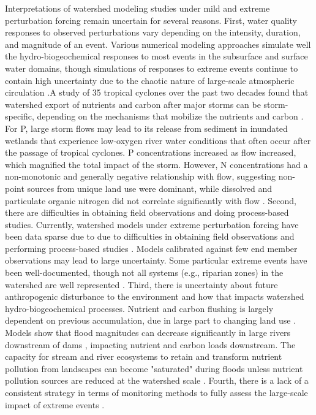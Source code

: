 \documentclass[preprint,review, 12pt]{elsarticle}
\begin{document}
Interpretations of watershed modeling studies under mild and extreme perturbation forcing remain uncertain for several reasons. First, water quality responses to observed perturbations vary depending on the intensity, duration, and magnitude of an event. Various numerical modeling approaches simulate well the hydro-biogeochemical responses to most events in the subsurface and surface water domains, though simulations of responses to extreme events continue to contain high uncertainty due to the chaotic nature of large-scale atmospheric circulation \citep{Shepherd2014}.A study of 35 tropical cyclones over the past two decades found that watershed export of nutrients and carbon after major storms can be storm-specific, depending on the mechanisms that mobilize the nutrients and carbon \citep{Paerl2018b}. For P, large storm flows may lead to its release from sediment in inundated wetlands that experience low-oxygen river water conditions that often occur after the passage of tropical cyclones.  P concentrations increased as flow increased, which magnified the total impact of the storm. However, N concentrations had a non-monotonic and generally negative relationship with flow, suggesting non-point sources from unique land use were dominant, while dissolved and particulate organic nitrogen did not correlate significantly with flow  \citep{Paerl2018b}. Second, there are difficulties in obtaining field observations and doing process-based studies. Currently, watershed models under extreme perturbation forcing have been data sparse due to due to difficulties in obtaining field observations and performing process-based studies \citep{Kaushal2018g, Vidon2018}. Models calibrated against few end member observations may lead to large uncertainty. Some particular extreme events have been well-documented, though not all systems (e.g., riparian zones) in the watershed are well represented \citep{Vidon2018}. Third, there is uncertainty about future anthropogenic disturbance to the environment and how that impacts watershed hydro-biogeochemical processes. Nutrient and carbon flushing is largely dependent on previous accumulation, due in large part to changing land use \citep{Paerl2018b}. Models show that flood magnitudes can decrease significantly in large rivers downstream of dams \citep{Lu2017a}, impacting nutrient and carbon loads downstream.  The capacity for stream and river ecosystems to retain and transform nutrient pollution from landscapes can become "saturated" during floods unless nutrient pollution sources are reduced at the watershed scale \citep{Kaushal2018g}. Fourth, there is a lack of a consistent strategy in terms of monitoring methods to fully assess the large-scale impact of extreme events \citep{Vidon2018}. 
\end{document}
